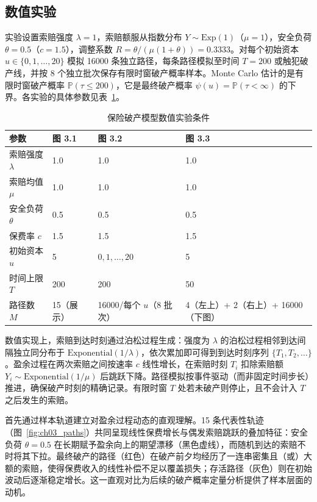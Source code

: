 \subsection{数值实验}

实验设置索赔强度 $\lambda = 1$，索赔额服从指数分布 $Y \sim \text{Exp}(1)$（$\mu = 1$），安全负荷 $\theta = 0.5$（$c = 1.5$），调整系数 $R = \theta/(\mu(1+\theta)) = 0.3333$。对每个初始资本 $u \in \{0, 1, \dots, 20\}$ 模拟 16000 条独立路径，每条路径模拟至时间 $T = 200$ 或触犯破产线，并按 8 个独立批次保存有限时窗破产概率样本。Monte Carlo 估计的是有限时窗破产概率 $\mathbb{P}(\tau \leqslant 200)$，它是最终破产概率 $\psi(u)=\mathbb{P}(\tau<\infty)$ 的下界。各实验的具体参数见表~\ref{tab:insurance_params}。

\begin{table}[H]
  \centering
  \caption{保险破产模型数值实验条件}
  \label{tab:insurance_params}
  \begin{tabular}{llll}
    \toprule
    参数 & 图 3.1 & 图 3.2 & 图 3.3 \\
    \midrule
    索赔强度 $\lambda$ & 1.0 & 1.0 & 1.0 \\
    索赔均值 $\mu$ & 1.0 & 1.0 & 1.0 \\
    安全负荷 $\theta$ & 0.5 & 0.5 & 0.5 \\
    保费率 $c$ & 1.5 & 1.5 & 1.5 \\
    初始资本 $u$ & 5 & $0,1,\dots,20$ & 5 \\
    时间上限 $T$ & 200 & 200 & 50 \\
    路径数 $M$ & 15（展示） & 16000/每个 $u$（8 批次） & 4（左上）+ 2（右上）+ 16000（下图） \\
    \bottomrule
  \end{tabular}
\end{table}

数值实现上，索赔到达时刻通过泊松过程生成：强度为 $\lambda$ 的泊松过程相邻到达间隔独立同分布于 $\text{Exponential}(1/\lambda)$，依次累加即可得到到达时刻序列 $\{T_1, T_2, \dots\}$。盈余过程在两次索赔之间按速率 $c$ 线性增长，在索赔时刻 $T_i$ 扣除索赔额 $Y_i \sim \text{Exponential}(1/\mu)$ 后跳跃下降。路径模拟按事件驱动（而非固定时间步长）推进，确保破产时刻的精确记录。有限时窗 $T$ 处若未破产则停止，且不会计入 $T$ 之后发生的索赔。

首先通过样本轨道建立对盈余过程动态的直观理解。15 条代表性轨迹（图~\ref{fig:ch03_paths}）共同呈现线性保费增长与偶发索赔跳跃的叠加特征：安全负荷 $\theta = 0.5$ 在长期赋予盈余向上的期望漂移（黑色虚线），而随机到达的索赔不时将其下拉。最终破产的路径（红色）在破产前夕均经历了一连串密集且（或）大额的索赔，使得保费收入的线性补偿不足以覆盖损失；存活路径（灰色）则在初始波动后逐渐稳定增长。这一直观对比为后续的破产概率定量分析提供了样本层面的动机。


